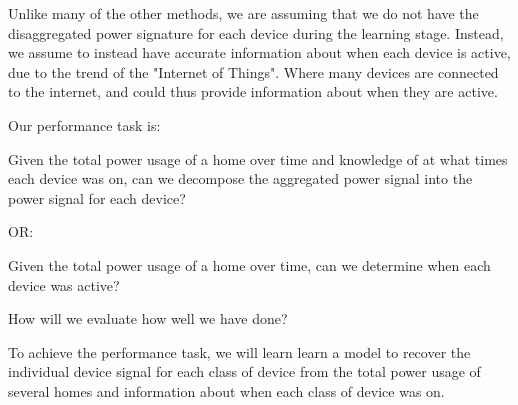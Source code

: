 \documentclass{article}
\begin{document}
Unlike many of the other methods, we are assuming that we do not have the disaggregated power signature for each device during the learning stage.
Instead, we assume to instead have accurate information about when each device is active, due to the trend of the "Internet of Things".
Where many devices are connected to the internet, and could thus provide information about when they are active.

Our performance task is:

Given the total power usage of a home over time and knowledge of at what times each device was on, can we decompose the aggregated power signal into the power signal for each device?

OR:

Given the total power usage of a home over time, can we determine when each device was active?

How will we evaluate how well we have done?



To achieve the performance task, we will learn learn a model to recover the individual device signal for each class of device from the total power usage of several homes and information about when each class of device was on.




\end{document}
